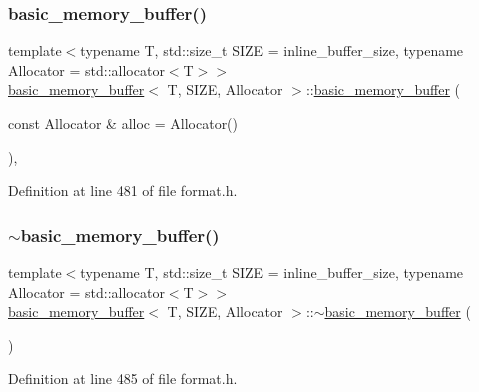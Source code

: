 \subsubsection{\texorpdfstring{basic\+\_\+memory\+\_\+buffer()}{basic\_memory\_buffer()}\hspace{0.1cm}{\footnotesize\ttfamily [1/2]}}
{\footnotesize\ttfamily template$<$typename T, std\+::size\+\_\+t S\+I\+ZE = inline\+\_\+buffer\+\_\+size, typename Allocator = std\+::allocator$<$\+T$>$$>$ \\
\hyperlink{classbasic__memory__buffer}{basic\+\_\+memory\+\_\+buffer}$<$ T, S\+I\+ZE, Allocator $>$\+::\hyperlink{classbasic__memory__buffer}{basic\+\_\+memory\+\_\+buffer} (\begin{DoxyParamCaption}\item[{const Allocator \&}]{alloc = {\ttfamily Allocator()} }\end{DoxyParamCaption})\hspace{0.3cm}{\ttfamily [inline]}, {\ttfamily [explicit]}}



Definition at line 481 of file format.\+h.

\mbox{\label{classbasic__memory__buffer_a05e9c75571c728ebcf299c6670f12569}} 
\subsubsection{\texorpdfstring{$\sim$basic\+\_\+memory\+\_\+buffer()}{~basic\_memory\_buffer()}}
{\footnotesize\ttfamily template$<$typename T, std\+::size\+\_\+t S\+I\+ZE = inline\+\_\+buffer\+\_\+size, typename Allocator = std\+::allocator$<$\+T$>$$>$ \\
\hyperlink{classbasic__memory__buffer}{basic\+\_\+memory\+\_\+buffer}$<$ T, S\+I\+ZE, Allocator $>$\+::$\sim$\hyperlink{classbasic__memory__buffer}{basic\+\_\+memory\+\_\+buffer} (\begin{DoxyParamCaption}{ }\end{DoxyParamCaption})\hspace{0.3cm}{\ttfamily [inline]}}



Definition at line 485 of file format.\+h.

